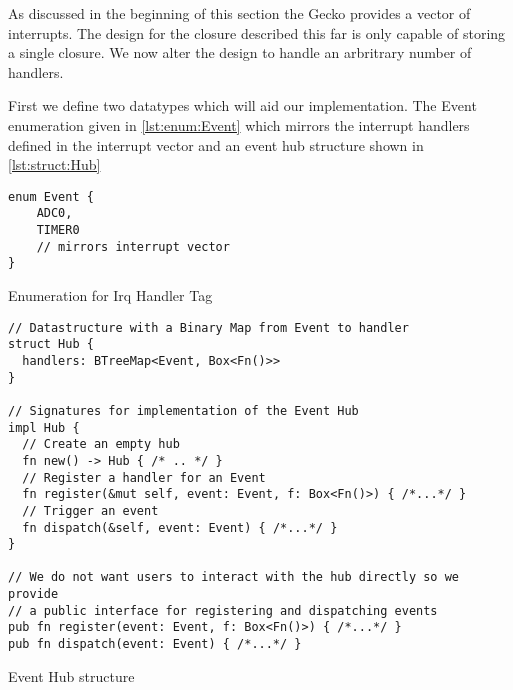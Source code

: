 As discussed in the beginning of this section the Gecko provides a vector of interrupts.
The design for the closure described this far is only capable of storing a single closure.
We now alter the design to handle an arbritrary number of handlers.

First we define two datatypes which will aid our implementation.
The Event enumeration given in \autoref{lst:enum:Event} which mirrors the interrupt handlers defined in the interrupt vector and an event hub structure shown in \autoref{lst:struct:Hub}

\begin{listing}[H]
  \begin{verbatim}
enum Event {
    ADC0,
    TIMER0
    // mirrors interrupt vector
}
  \end{verbatim}
  \caption{Enumeration for Irq Handler Tag}
  \label{lst:enum:Event}
\end{listing}

\begin{listing}[H]
  \begin{verbatim}
// Datastructure with a Binary Map from Event to handler
struct Hub {
  handlers: BTreeMap<Event, Box<Fn()>>
}

// Signatures for implementation of the Event Hub
impl Hub {
  // Create an empty hub
  fn new() -> Hub { /* .. */ }
  // Register a handler for an Event
  fn register(&mut self, event: Event, f: Box<Fn()>) { /*...*/ }
  // Trigger an event
  fn dispatch(&self, event: Event) { /*...*/ }
}

// We do not want users to interact with the hub directly so we provide
// a public interface for registering and dispatching events
pub fn register(event: Event, f: Box<Fn()>) { /*...*/ }
pub fn dispatch(event: Event) { /*...*/ }
  \end{verbatim}
  \caption{Event Hub structure}
  \label{lst:struct:Hub}
\end{listing}

